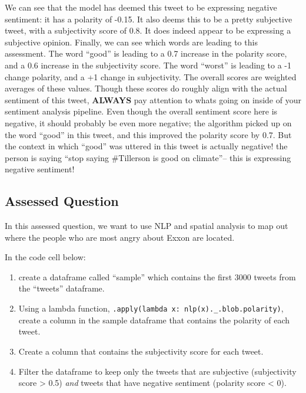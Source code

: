 \documentclass[
  letterpaper,
  DIV=11,
  numbers=noendperiod]{scrreprt}
\providecommand{\tightlist}{%
  \setlength{\itemsep}{0pt}\setlength{\parskip}{0pt}}\usepackage{longtable,booktabs,array}
\begin{document}
We can see that the model has deemed this tweet to be expressing
negative sentiment: it has a polarity of -0.15. It also deems this to be
a pretty subjective tweet, with a subjectivity score of 0.8. It does
indeed appear to be expressing a subjective opinion. Finally, we can see
which words are leading to this assessment. The word ``good'' is leading
to a 0.7 increase in the polarity score, and a 0.6 increase in the
subjectivity score. The word ``worst'' is leading to a -1 change
polarity, and a +1 change in subjectivity. The overall scores are
weighted averages of these values. Though these scores do roughly align
with the actual sentiment of this tweet, \textbf{ALWAYS} pay attention
to whats going on inside of your sentiment analysis pipeline. Even
though the overall sentiment score here is negative, it should probably
be even more negative; the algorithm picked up on the word ``good'' in
this tweet, and this improved the polarity score by 0.7. But the context
in which ``good'' was uttered in this tweet is actually negative! the
person is saying ``stop saying \#Tillerson is good on climate''-- this
is expressing negative sentiment!

\hypertarget{assessed-question-3}{%
\subsection{Assessed Question}\label{assessed-question-3}}

In this assessed question, we want to use NLP and spatial analysis to
map out where the people who are most angry about Exxon are located.

In the code cell below:

\begin{enumerate}
\def\labelenumi{\arabic{enumi}.}
\tightlist
\item
  create a dataframe called ``sample'' which contains the first 3000
  tweets from the ``tweets'' dataframe.
\item
  Using a lambda function,
  \texttt{.apply(lambda\ x:\ nlp(x).\_.blob.polarity)}, create a column
  in the sample dataframe that contains the polarity of each tweet.
\item
  Create a column that contains the subjectivity score for each tweet.
\item
  Filter the dataframe to keep only the tweets that are subjective
  (subjectivity score \textgreater{} 0.5) \emph{and} tweets that have
  negative sentiment (polarity score \textless{} 0).
\end{enumerate}
\end{document}
